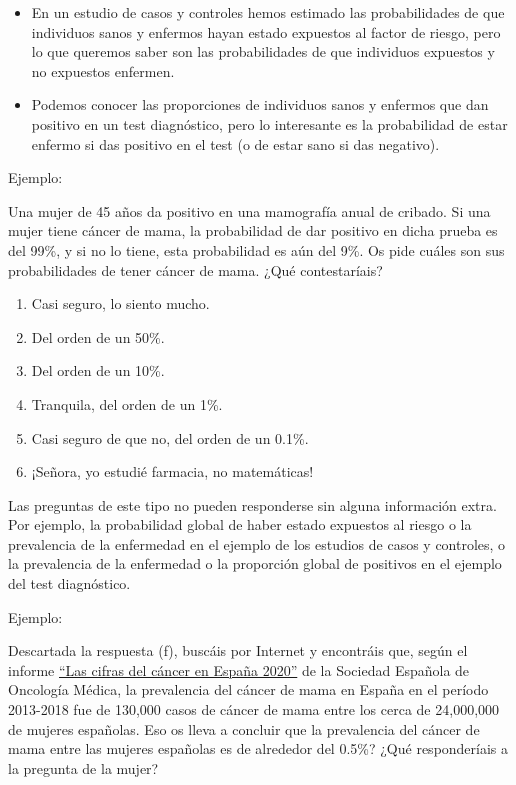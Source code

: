 \documentclass[
  spanish,
  letterpaper,
  DIV=11,
  numbers=noendperiod]{scrreprt}
\begin{document}
\begin{tcolorbox}
\begin{itemize}
\item
  En un estudio de casos y controles hemos estimado las probabilidades
  de que individuos sanos y enfermos hayan estado expuestos al factor de
  riesgo, pero lo que queremos saber son las probabilidades de que
  individuos expuestos y no expuestos enfermen.
\item
  Podemos conocer las proporciones de individuos sanos y enfermos que
  dan positivo en un test diagnóstico, pero lo interesante es la
  probabilidad de estar enfermo si das positivo en el test (o de estar
  sano si das negativo).
\end{itemize}

Ejemplo:

Una mujer de 45 años da positivo en una mamografía anual de cribado. Si
una mujer tiene cáncer de mama, la probabilidad de dar positivo en dicha
prueba es del 99\%, y si no lo tiene, esta probabilidad es aún del 9\%.
Os pide cuáles son sus probabilidades de tener cáncer de mama. ¿Qué
contestaríais?

\begin{enumerate}
\def\labelenumi{\alph{enumi}.}
\item
  Casi seguro, lo siento mucho.
\item
  Del orden de un 50\%.
\item
  Del orden de un 10\%.
\item
  Tranquila, del orden de un 1\%.
\item
  Casi seguro de que no, del orden de un 0.1\%.
\item
  ¡Señora, yo estudié farmacia, no matemáticas!
\end{enumerate}

Las preguntas de este tipo no pueden responderse sin alguna información
extra. Por ejemplo, la probabilidad global de haber estado expuestos al
riesgo o la prevalencia de la enfermedad en el ejemplo de los estudios
de casos y controles, o la prevalencia de la enfermedad o la proporción
global de positivos en el ejemplo del test diagnóstico.

Ejemplo:

Descartada la respuesta (f), buscáis por Internet y encontráis que,
según el informe
\href{https://seom.org/seomcms/images/stories/recursos/Cifras_del_cancer_2020.pdf}{``Las
cifras del cáncer en España 2020''} de la Sociedad Española de Oncología
Médica, la prevalencia del cáncer de mama en España en el período
2013-2018 fue de 130,000 casos de cáncer de mama entre los cerca de
24,000,000 de mujeres españolas. Eso os lleva a concluir que la
prevalencia del cáncer de mama entre las mujeres españolas es de
alrededor del 0.5\%? ¿Qué responderíais a la pregunta de la mujer?


\end{tcolorbox}
\end{document}
